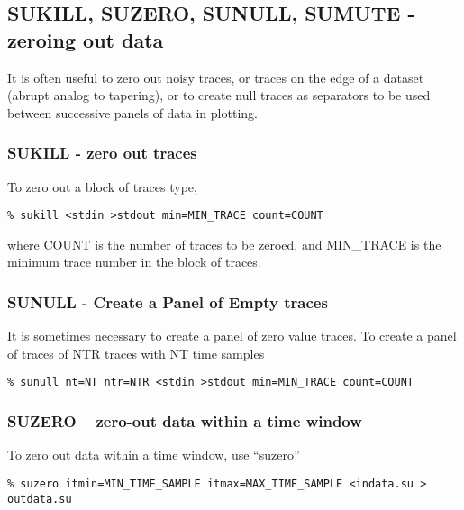 {{{{{{{\subsection{SUKILL, SUZERO, SUNULL, SUMUTE - zeroing out data}

It is often useful to zero out noisy traces, or traces
on the edge of a dataset (abrupt analog to tapering), or to create
null traces as separators to be used between successive panels of data
in plotting.

\subsubsection{SUKILL - zero out traces}

To zero out a block of traces type,
{\small \begin{verbatim}
% sukill <stdin >stdout min=MIN_TRACE count=COUNT				
\end{verbatim}}\noindent
where COUNT is the number of traces to be zeroed, and MIN\_TRACE
is the minimum trace number in the block of traces.

\subsubsection{SUNULL - Create a Panel of Empty traces}
It is sometimes necessary to create a panel of zero value traces.
To create a panel of traces of NTR traces with NT time samples 
{\small \begin{verbatim}
% sunull nt=NT ntr=NTR <stdin >stdout min=MIN_TRACE count=COUNT				
\end{verbatim}}\noindent

\subsubsection{SUZERO -- zero-out data within a time window}
To zero out data within a time window, use  ``suzero''
{\small \begin{verbatim}
% suzero itmin=MIN_TIME_SAMPLE itmax=MAX_TIME_SAMPLE <indata.su > outdata.su				
\end{verbatim}}\noindent

}}}}}}}
